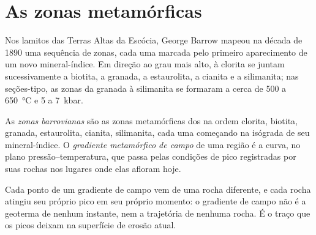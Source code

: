 \section{As zonas metamórficas}\label{sec:b2:pt-paths:zones}

Nos lamitos das Terras Altas da Escócia, George Barrow mapeou na década de 1890 uma sequência de
zonas, cada uma marcada pelo primeiro aparecimento de um novo mineral-índice. Em direção ao grau
mais alto, à clorita se juntam sucessivamente a biotita, a granada, a estaurolita, a cianita e a silimanita;
nas seções-tipo, as zonas da granada à silimanita se formaram a cerca de 500 a
\qty{650}{\celsius} e 5 a \qty{7}{kbar}.

\begin{definition}\label{def:b2:pt-paths:barrovian}
As \emph{zonas barrovianas} são as zonas metamórficas dos
 na ordem clorita, biotita, granada, estaurolita, cianita, silimanita,
cada uma começando na isógrada de seu mineral-índice. O \emph{gradiente metamórfico de
campo} de uma região é a curva, no
plano pressão--temperatura, que passa pelas condições de pico registradas por suas rochas nos
lugares onde elas afloram hoje.
\end{definition}

Cada ponto de um gradiente de campo vem de uma rocha diferente, e cada rocha atingiu seu próprio
pico em seu próprio momento: o gradiente de campo não é a geoterma de nenhum instante, nem a
trajetória de nenhuma rocha. É o traço que os picos deixam na superfície de erosão atual.

